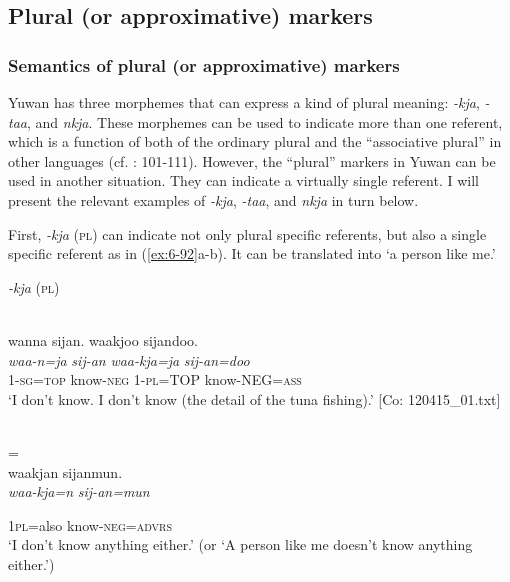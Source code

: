 \begin{table}
\subsection{Plural (or approximative) markers}
\subsubsection{Semantics of plural (or approximative) markers}

Yuwan has three morphemes that can express a kind of plural meaning: \textit{-kja}, \textit{-taa}, and \textit{nkja}. These morphemes can be used to indicate more than one referent, which is a function of both of the ordinary plural and the “associative plural” in other languages (cf. \citealt{Corbett2000}: 101-111). However, the “plural” markers in Yuwan can be used in another situation. They can indicate a virtually single referent. I will present the relevant examples of \textit{-kja}, \textit{-taa}, and \textit{nkja} in turn below.

First, \textit{-kja} (\textsc{pl}) can indicate not only plural specific referents, but also a single specific referent as in (\ref{ex:6-92}a-b). It can be translated into ‘a person like me.’

\ea\label{ex:6-92}
  \textit{-kja} (\textsc{pl})

 \ea{}\\
{\TM}
\glll  wanna  sijan.  waakjoo  sijandoo.\\
\textit{waa-n=ja}  \textit{sij-an}  \textit{waa-kja=ja}  \textit{sij-an=doo}\\
1-\textsc{sg}=\textsc{top}  know-\textsc{neg}  1-\textsc{pl}=TOP  know-NEG=\textsc{ass}\\
\glt ‘I don’t know. I don’t know (the detail of the tuna fishing).’ [Co: 120415\_01.txt]
\z

\ex{}\\
\glll = \\

{\TM}
\glll waakjan  sijanmun.\\

      \textit{waa-kja=n}  \textit{sij-an=mun}

      1\textsc{pl}=also  know-\textsc{neg}=\textsc{advrs}\\
\glt ‘I don’t know anything either.’ (or ‘A person like me doesn’t know anything either.’)


\end{table}
